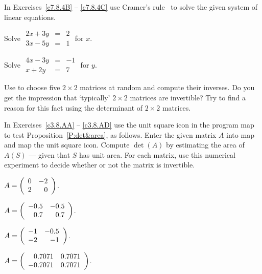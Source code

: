 \noindent In Exercises~\ref{c7.8.4B} -- \ref{c7.8.4C} use Cramer's 
rule~ to solve the given system of linear 
equations.
\begin{exercise} \label{c7.8.4B}
Solve \qquad $\begin{array}{rcl} 2x+3y & = & 2 \\ 3x - 5y & = & 1 \end{array}$ 
\qquad for $x$.
\end{exercise} 
\begin{exercise} \label{c7.8.4C}
Solve \qquad
$\begin{array}{rcl} 4x-3y & = & -1 \\ x + 2y & = & 7 \end{array}$ 
\qquad for $y$.
\end{exercise}

\CEXER

\begin{exercise} \label{c4.9.9}
Use \Matlab to choose five $2\times 2$ matrices at random and compute
their inverses.  Do you get the impression that `typically'
$2\times 2$ matrices are invertible?  Try to find a reason for
this fact using the determinant of $2\times 2$ matrices.
\end{exercise}

\noindent  In Exercises~\ref{c3.8.AA} -- \ref{c3.8.AD} use the {\sf unit 
square} icon in the program {\sf map} to test Proposition~\ref{P:det&area}, as 
follows. Enter the given matrix $A$ into {\sf map} and map the {\sf unit 
square} icon.  Compute $\det(A)$ by estimating the area of $A(S)$ --- given 
that $S$ has unit area.  For each matrix, use this numerical experiment to 
decide whether or not the matrix is invertible.
\begin{exercise}  \label{c3.8.AA}
$A=\left(\begin{array}{rr} 0 & -2\\ 2 &0\end{array}\right)$.
\end{exercise}
\begin{exercise}  \label{c3.8.AB}
$A=\left(\begin{array}{rr} -0.5 & -0.5\\ 0.7 &0.7\end{array}\right)$.
\end{exercise}
\begin{exercise}  \label{c3.8.AC}
$A=\left(\begin{array}{rr} -1 & -0.5\\ -2 &-1\end{array}\right)$.
\end{exercise}
\begin{exercise}  \label{c3.8.AD}
$A=\left(\begin{array}{rr} 0.7071 & 0.7071\\ -0.7071 &0.7071\end{array}\right)$.
\end{exercise}

